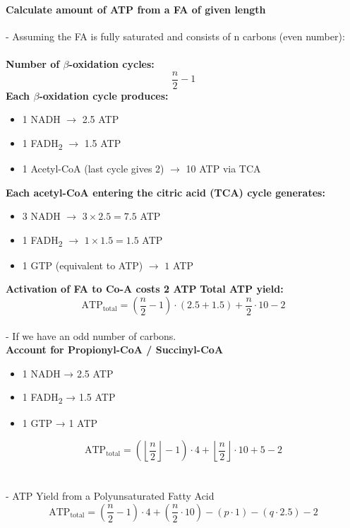 \documentclass[../main.tex]{subfiles}
\begin{document}
\paragraph{Calculate amount of ATP from a FA of given length}

- Assuming the FA is fully saturated and consists of n carbons (even number):\\
\\
\textbf{Number of $\beta$-oxidation cycles:}
\[
\frac{n}{2} - 1
\]
\textbf{Each $\beta$-oxidation cycle produces:}
\begin{itemize}
	\item 1 NADH $\rightarrow$ 2.5 ATP
	\item 1 FADH\textsubscript{2} $\rightarrow$ 1.5 ATP
	\item 1 Acetyl-CoA (last cycle gives 2) $\rightarrow$ 10 ATP via TCA
\end{itemize}
\noindent
\textbf{Each acetyl-CoA entering the citric acid (TCA) cycle generates:}
\begin{itemize}
	\item 3 NADH $\rightarrow$ $3 \times 2.5 = 7.5$ ATP
	\item 1 FADH\textsubscript{2} $\rightarrow$ $1 \times 1.5 = 1.5$ ATP
	\item 1 GTP (equivalent to ATP) $\rightarrow$ $1$ ATP
\end{itemize}
\noindent
\textbf{Activation of FA to Co-A costs 2 ATP}
\textbf{Total ATP yield:}
\[
\text{ATP}_{\text{total}} = \left( \frac{n}{2} - 1 \right) \cdot (2.5 + 1.5) + \frac{n}{2} \cdot 10 - 2
\]
\noindent
\\
- If we have an odd number of carbons. 
\\ 
\noindent
\textbf{Account for Propionyl-CoA / Succinyl-CoA}
\begin{itemize}
	\item 1 NADH → 2.5 ATP
	\item 1 FADH\textsubscript{2} → 1.5 ATP
	\item 1 GTP → 1 ATP
\end{itemize}
\noindent
\[
\text{ATP}_{\text{total}} = \left( \left\lfloor \frac{n}{2} \right\rfloor - 1 \right) \cdot 4 + \left\lfloor \frac{n}{2} \right\rfloor \cdot 10 + 5 - 2
\]
\\
\\
- ATP Yield from a Polyunsaturated Fatty Acid
\[
\text{ATP}_{\text{total}} = \left( \frac{n}{2} - 1 \right) \cdot 4 + \left( \frac{n}{2} \cdot 10 \right) - (p \cdot 1) - (q \cdot 2.5) - 2
\]
\end{document}
